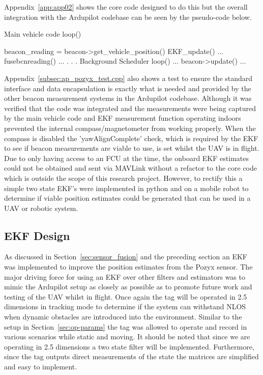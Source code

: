Appendix~\ref{app:app02} shows the core code designed to do this but the overall integration with the Ardupilot codebase can be seen by the pseudo-code below.
\begin{algorithm}
    Main vehicle code
        loop()
        {
            beacon_reading = beacon->get_vehicle_position()
            EKF_update()
            {
                ...
                fusebcnreading()
                ...
            }
            .
            .
            .
    Background Scheduler
        loop()
        {
            ...
            beacon->update()
            ...
        }

        }
\end{algorithm}

Appendix~\ref{subsec:ap_pozyx_test.cpp} also shows a test to ensure the standard interface and data encapsulation is exactly what is needed and provided by the other beacon measurement systems in the Ardupilot codebase.
Although it was verified that the code was integrated and the measurements were being captured by the main vehicle code and EKF measurement function operating indoors prevented the internal compass/magnetometer from working properly.
When the compass is disabled the 'yawAlignComplete' check, which is required by the EKF to see if beacon measurements are viable to use, is set whilst the UAV is in flight.
Due to only having access to an FCU at the time, the onboard EKF estimates could not be obtained and sent via MAVLink without a refactor to the core code which is outside the scope of this research project.
However, to rectify this a simple two state EKF's were implemented in python and on a mobile robot to determine if viable position estimates could be generated that can be used in a UAV or robotic system.

\subsection*{EKF Design}
As discussed in Section~\ref{sec:sensor_fusion} and the preceding section an EKF was implemented to improve the position estimates from the Pozyx sensor.
The major driving force for using an EKF over other filters and estimators was to mimic the Ardupilot setup as closely as possible as to promote future work and testing of the UAV whilst in flight.
Once again the tag will be operated in 2.5 dimensions in tracking mode to determine if the system can withstand NLOS when dynamic obstacles are introduced into the environment.
Similar to the setup in Section~\ref{sec:op-params} the tag was allowed to operate and record in various scenarios while static and moving.
It should be noted that since we are operating in 2.5 dimensions a two state filter will be implemented.
Furthermore, since the tag outputs direct measurements of the state the matrices are simplified and easy to implement.

